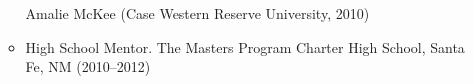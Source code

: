 \documentclass[11pt]{article}
\begin{document}
\begin{itemize}
\begin{itemize}
      Amalie McKee (Case Western Reserve University, 2010)
    \item High School Mentor. The Masters Program Charter High School, Santa Fe, NM (2010--2012)
    \end{itemize}
  \end{itemize}
  
\end{document}
